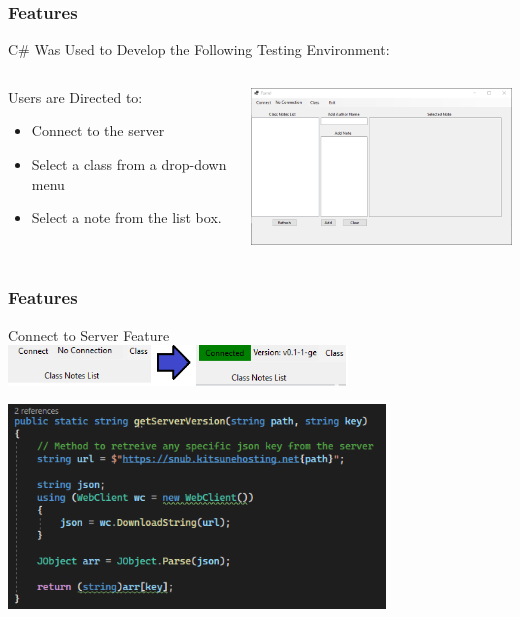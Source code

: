 \documentclass[aspectratio=169]{beamer}
\begin{document}
\begin{frame}
    \frametitle{Features}

    
    \begin{block}{\centering C\# Was Used to Develop the Following Testing Environment:}
    \end{block}
    \begin{columns}
        \begin{column}{0.3\textwidth}
            \begin{block}{Users are Directed to:}
            \begin{itemize}
                \item Connect to the server
                \item Select a class from a drop-down menu
                \item Select a note from the list box.
            \end{itemize}
            \end{block}
        \end{column}
        \begin{column}{0.48\textwidth}
            \includegraphics[width=8cm]{Test UI image 001.PNG}
        \end{column}
    \end{columns}

\end{frame}





\begin{frame}
    \frametitle{Features}

    \begin{block}{\centering Connect to Server Feature}
        \centering \includegraphics [width=9cm] {connect_to_connected.png}
    \end{block}

    \centering \includegraphics [width=10cm] {getServerVersion.png}
    
\end{frame}
\end{document}
